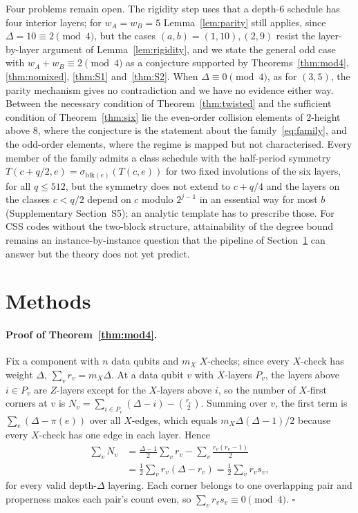 \documentclass[reprint,twocolumn,superscriptaddress,nofootinbib]{revtex4-2}
\theoremstyle{plain}
\newcommand{\wA}{w_A}                  %
\newcommand{\wB}{w_B}
\begin{document}
Four problems remain open. The rigidity step uses that a depth-$6$
schedule has four interior layers; for $\wA=\wB=5$ Lemma~\ref{lem:parity}
still applies, since $\Delta=10\equiv2\pmod 4$, but the cases
$(a,b)=(1,10),(2,9)$ resist the layer-by-layer argument of
Lemma~\ref{lem:rigidity}, and we state the general odd case with
$\wA+\wB\equiv2\pmod 4$ as a conjecture supported by
Theorems~\ref{thm:mod4}, \ref{thm:nomixed}, \ref{thm:S1}
and~\ref{thm:S2}. When $\Delta\equiv0\pmod 4$, as for $(3,5)$, the parity
mechanism gives no contradiction and we have no evidence either way.
Between the necessary condition of Theorem~\ref{thm:twisted} and the
sufficient condition of Theorem~\ref{thm:six} lie the even-order collision
elements of $2$-height above $8$, where the conjecture is the statement
about the family~\eqref{eq:family}, and the odd-order elements, where the
regime is mapped but not characterised. Every member of the family admits
a class schedule with the half-period symmetry
$T(c+q/2,e)=\sigma_{\mathrm{blk}(e)}(T(c,e))$ for two fixed involutions of
the six layers, for all $q\le512$, but the symmetry does not extend to
$c+q/4$ and the layers on the classes $c<q/2$ depend on $c$ modulo
$2^{j-1}$ in an essential way for most $b$ (Supplementary Section~S5); an
analytic template has to prescribe those. For CSS codes without the
two-block structure,
attainability of the degree bound remains an instance-by-instance question
that the pipeline of Section~\ref{sec:methods} can answer but the theory
does not yet predict.

\section{Methods}
\label{sec:methods}

\paragraph*{Proof of Theorem~\ref{thm:mod4}.}
Fix a component with $n$ data qubits and $m_X$ $X$-checks; since every
$X$-check has weight $\Delta$, $\sum_vr_v=m_X\Delta$. At a data qubit $v$
with $X$-layers $P_v$, the layers above $i\in P_v$ are $Z$-layers except
for the $X$-layers above $i$, so the number of $X$-first corners at $v$ is
$N_v=\sum_{i\in P_v}(\Delta-i)-\binom{r_v}{2}$. Summing over $v$, the first
term is $\sum_e(\Delta-\pi(e))$ over all $X$-edges, which equals
$m_X\Delta(\Delta-1)/2$ because every $X$-check has one edge in each
layer. Hence
\begin{align}
\sum_vN_v
&=\frac{\Delta-1}{2}\sum_vr_v-\sum_v\frac{r_v(r_v-1)}{2}\nonumber\\
&=\frac12\sum_vr_v(\Delta-r_v)=\frac12\sum_vr_vs_v ,
\end{align}
for every valid depth-$\Delta$ layering. Each corner belongs to one
overlapping pair and properness makes each pair's count even, so
$\sum_vr_vs_v\equiv0\pmod 4$. \hfill$\square$
\end{document}
